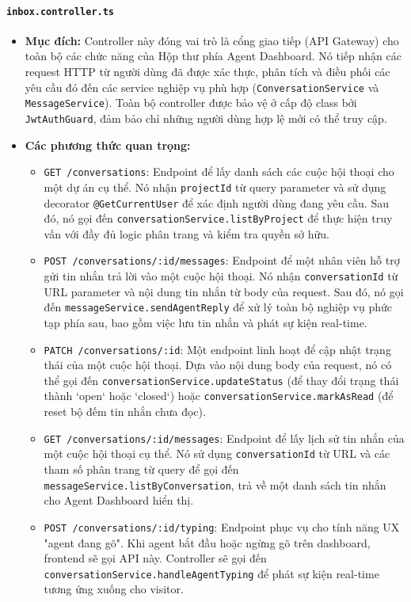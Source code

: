 \paragraph{\texttt{inbox.controller.ts}}
\begin{itemize}
    \item \textbf{Mục đích:} Controller này đóng vai trò là cổng giao tiếp (API Gateway) cho toàn bộ các chức năng của Hộp thư phía Agent Dashboard. Nó tiếp nhận các request HTTP từ người dùng đã được xác thực, phân tích và điều phối các yêu cầu đó đến các service nghiệp vụ phù hợp (\texttt{ConversationService} và \texttt{MessageService}). Toàn bộ controller được bảo vệ ở cấp độ class bởi \texttt{JwtAuthGuard}, đảm bảo chỉ những người dùng hợp lệ mới có thể truy cập.
    
    \item \textbf{Các phương thức quan trọng:}    
    \begin{itemize}
        \item \texttt{GET /conversations}: Endpoint để lấy danh sách các cuộc hội thoại cho một dự án cụ thể. Nó nhận \texttt{projectId} từ query parameter và sử dụng decorator \texttt{@GetCurrentUser} để xác định người dùng đang yêu cầu. Sau đó, nó gọi đến \texttt{conversationService.listByProject} để thực hiện truy vấn với đầy đủ logic phân trang và kiểm tra quyền sở hữu.
        
        \item \texttt{POST /conversations/:id/messages}: Endpoint để một nhân viên hỗ trợ gửi tin nhắn trả lời vào một cuộc hội thoại. Nó nhận \texttt{conversationId} từ URL parameter và nội dung tin nhắn từ body của request. Sau đó, nó gọi đến \texttt{messageService.sendAgentReply} để xử lý toàn bộ nghiệp vụ phức tạp phía sau, bao gồm việc lưu tin nhắn và phát sự kiện real-time.
        
        \item \texttt{PATCH /conversations/:id}: Một endpoint linh hoạt để cập nhật trạng thái của một cuộc hội thoại. Dựa vào nội dung body của request, nó có thể gọi đến \texttt{conversationService.updateStatus} (để thay đổi trạng thái thành `open` hoặc `closed`) hoặc \texttt{conversationService.markAsRead} (để reset bộ đếm tin nhắn chưa đọc).
        
        \item \texttt{GET /conversations/:id/messages}: Endpoint để lấy lịch sử tin nhắn của một cuộc hội thoại cụ thể. Nó sử dụng \texttt{conversationId} từ URL và các tham số phân trang từ query để gọi đến \texttt{messageService.listByConversation}, trả về một danh sách tin nhắn cho Agent Dashboard hiển thị.

        \item \texttt{POST /conversations/:id/typing}: Endpoint phục vụ cho tính năng UX "agent đang gõ". Khi agent bắt đầu hoặc ngừng gõ trên dashboard, frontend sẽ gọi API này. Controller sẽ gọi đến \texttt{conversationService.handleAgentTyping} để phát sự kiện real-time tương ứng xuống cho visitor.
    \end{itemize}
\end{itemize}